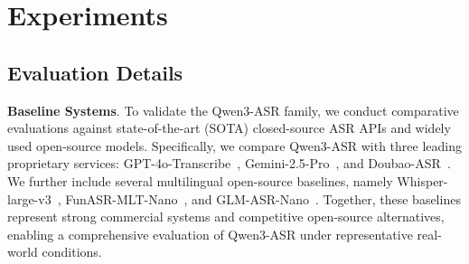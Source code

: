 \section{Experiments }

\subsection{Evaluation Details}

\textbf{Baseline Systems}. To validate the Qwen3-ASR family, we conduct comparative evaluations against state-of-the-art (SOTA) closed-source ASR APIs and widely used open-source models. Specifically, we compare Qwen3-ASR with three leading proprietary services: GPT-4o-Transcribe~\citep{gpt4o}, Gemini-2.5-Pro~\citep{gemini2.5}, and Doubao-ASR~\citep{seedasr}. We further include several multilingual open-source baselines, namely Whisper-large-v3~\citep{icml2023-alec-Whisper}, FunASR-MLT-Nano~\citep{funasr-slm}, and GLM-ASR-Nano~\citep{zai-glm-asr-2512}. Together, these baselines represent strong commercial systems and competitive open-source alternatives, enabling a comprehensive evaluation of Qwen3-ASR under representative real-world conditions.

